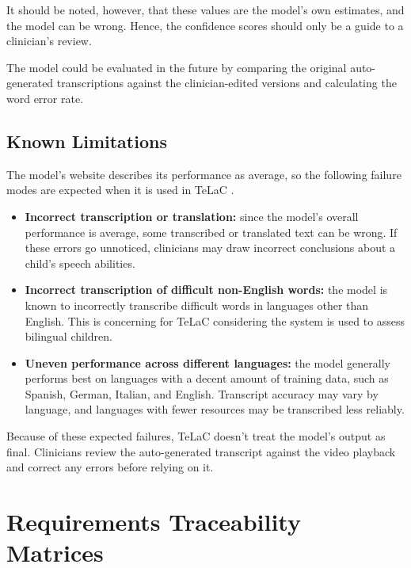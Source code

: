 \documentclass[12pt]{article}
\begin{document}
It should be noted, however, that these values are the model's own estimates, and the model can be wrong. Hence, the confidence scores should only be a guide to a clinician's review.

The model could be evaluated in the future by comparing the original auto-generated transcriptions against the clinician-edited versions and calculating the word error rate. 
\subsection{Known Limitations} \label{sec:KnownLimitations}

The model’s website describes its performance as average, so the following failure modes are expected when it is used in TeLaC \citep{Laumann_Whisper_2022}.
\begin{itemize}
  \item \textbf{Incorrect transcription or translation:} since the model’s overall performance is average, some transcribed or translated text can be wrong. If these errors go unnoticed, clinicians may draw incorrect conclusions about a child’s speech abilities.
  \item \textbf{Incorrect transcription of difficult non-English words:} the model is known to incorrectly transcribe difficult words in languages other than English. This is concerning for TeLaC considering the system is used to assess bilingual children.
  \item \textbf{Uneven performance across different languages:} the model generally performs best on languages with a decent amount of training data, such as Spanish, German, Italian, and English. Transcript accuracy may vary by language, and languages with fewer resources may be transcribed less reliably.
\end{itemize}

Because of these expected failures, TeLaC doesn’t treat the model’s output as final. 
Clinicians review the auto-generated transcript against the video playback and correct any errors before relying on it.

\section{Requirements Traceability Matrices}
\end{document}
